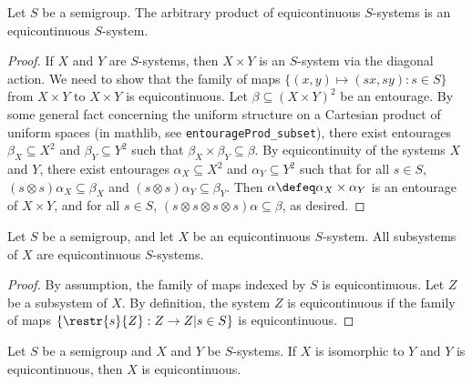 \begin{lemma}
    \label{lemma_arbitrary_product_of_equi_is_equi}
    Let $S$ be a semigroup.  The arbitrary product of equicontinuous $S$-systems is an equicontinuous $S$-system.
\end{lemma}

\begin{proof}
     If $X$ and $Y$ are $S$-systems, then $X \times Y$ is an $S$-system via the diagonal action.  We need to show that the family of maps $\{(x,y) \mapsto (sx,sy) : s \in S\}$ from $X \times Y$ to $X \times Y$ is equicontinuous. Let $\beta \subseteq (X \times Y)^2$ be an entourage.  By some general fact concerning the uniform structure on a Cartesian product of uniform spaces (in mathlib, see \verb|entourageProd_subset|), there exist entourages $\beta_X \subseteq X^2$ and $\beta_Y \subseteq Y^2$ such that $\beta_X \times \beta_Y \subseteq \beta$. By equicontinuity of the systems $X$ and $Y$, there exist entourages $\alpha_X \subseteq X^2$ and $\alpha_Y \subseteq Y^2$ such that for all $s \in S$, $(s \otimes s) \alpha_X \subseteq \beta_X$ and $(s \otimes s) \alpha_Y \subseteq \beta_Y$. Then $
    \alpha \defeq \alpha_X \times \alpha_Y$ is an entourage of $X \times Y$, and for all $s \in S$, $(s \otimes s \otimes s \otimes s)\alpha \subseteq \beta$, as desired.
\end{proof}

\begin{lemma}
    \label{lemma_subsys_of_equi_is_equi}
    \leanok{}
    Let $S$ be a semigroup, and let $X$ be an equicontinuous $S$-system.  All subsystems of $X$ are equicontinuous $S$-systems.
\end{lemma}

\begin{proof}
\leanok{}
    By assumption, the family of maps indexed by $S$ is equicontinuous.  Let $Z$ be a subsystem of $X$.  By definition, the system $Z$ is equicontinuous if the family of maps $\{\restr{s}{Z}: Z \to Z | s \in S\}$ is equicontinuous.  
\end{proof}


\begin{theorem}
    \label{thm_isom_to_equi_is_equi}
    Let $S$ be a semigroup and $X$ and $Y$ be $S$-systems.  If $X$ is isomorphic to $Y$ and $Y$ is equicontinuous, then $X$ is equicontinuous.
\end{theorem}


